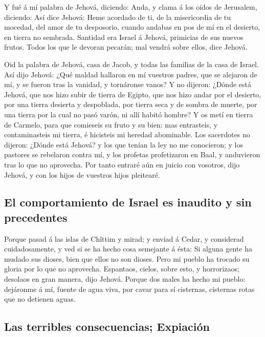  Y fué á mí palabra de Jehová, diciendo:  Anda,
y clama á los oídos de Jerusalem, diciendo: Así dice Jehová: Heme
acordado de ti, de la misericordia de tu mocedad, del amor de tu
desposorio, cuando andabas en pos de mí en el desierto, en tierra no
sembrada.  Santidad era Israel á Jehová, primicias de sus
nuevos frutos. Todos los que le devoran pecarán; mal vendrá sobre ellos,
dice Jehová.

 Oid la palabra de Jehová, casa de Jacob, y todas las
familias de la casa de Israel.  Así dijo Jehová: ¿Qué maldad
hallaron en mí vuestros padres, que se alejaron de mí, y se fueron tras
la vanidad, y tornáronse vanos?  Y no dijeron: ¿Dónde está
Jehová, que nos hizo subir de tierra de Egipto, que nos hizo andar por
el desierto, por una tierra desierta y despoblada, por tierra seca y de
sombra de muerte, por una tierra por la cual no pasó varón, ni allí
habitó hombre?  Y os metí en tierra de Carmelo, para que
comieseis su fruto y su bien: mas entrasteis, y contaminasteis mi
tierra, é hicisteis mi heredad abominable.  Los sacerdotes
no dijeron: ¿Dónde está Jehová? y los que tenían la ley no me
conocieron; y los pastores se rebelaron contra mí, y los profetas
profetizaron en Baal, y anduvieron tras lo que no aprovecha.
 Por tanto entraré aún en juicio con vosotros, dijo Jehová,
y con los hijos de vuestros hijos pleitearé.

\hypertarget{el-comportamiento-de-israel-es-inaudito-y-sin-precedentes}{%
\subsection{El comportamiento de Israel es inaudito y sin
precedentes}\label{el-comportamiento-de-israel-es-inaudito-y-sin-precedentes}}

 Porque pasad á las islas de Chîttim y mirad; y enviad á
Cedar, y considerad cuidadosamente, y ved si se ha hecho cosa semejante
á ésta:  Si alguna gente ha mudado sus dioses, bien que
ellos no son dioses. Pero mi pueblo ha trocado su gloria por lo que no
aprovecha.  Espantaos, cielos, sobre esto, y horrorizaos;
desolaos en gran manera, dijo Jehová.  Porque dos males ha
hecho mi pueblo: dejáronme á mí, fuente de agua viva, por cavar para sí
cisternas, cisternas rotas que no detienen aguas.

\hypertarget{las-terribles-consecuencias-expiaciuxf3n}{%
\subsection{Las terribles consecuencias;
Expiación}\label{las-terribles-consecuencias-expiaciuxf3n}}

